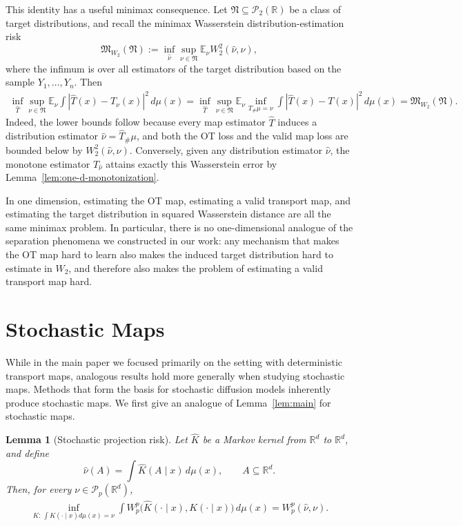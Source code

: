 \documentclass[11pt,twoside]{article}
\newtheorem{lemma}{Lemma}
\newcommand{\targetclass}{\mathfrak{N}}
\newcommand{\wtwominimaxrisk}{\mathfrak M_{W_2}}
\begin{document}
This identity has a useful minimax consequence. Let $\targetclass\subseteq\mathcal{P}_2(\mathbb{R})$ be a class of target distributions, and recall the minimax Wasserstein distribution-estimation risk
\[
\wtwominimaxrisk(\targetclass)
:=
\inf_{\widehat{\nu}}
\sup_{\nu\in\targetclass}
\mathbb{E}_\nu W_2^2(\widehat{\nu},\nu),
\]
where the infimum is over all estimators of the target distribution based on the sample $Y_1,\ldots,Y_n$. Then
\begin{align}
\label{eq:one-d-minimax-equivalence}
\inf_{\widehat{T}}
\sup_{\nu\in\targetclass}
\mathbb{E}_\nu
\int |\widehat{T}(x)-T_\nu(x)|^2\,d\mu(x)
=
\inf_{\widehat{T}}
\sup_{\nu\in\targetclass}
\mathbb{E}_\nu
\inf_{T_{\#}\mu=\nu}
\int |\widehat{T}(x)-T(x)|^2\,d\mu(x)
=
\wtwominimaxrisk(\targetclass).
\end{align}
Indeed, the lower bounds follow because every map estimator $\widehat{T}$ induces a distribution estimator $\widehat{\nu}=\widehat{T}_{\#}\mu$, and both the OT loss and the valid map loss are bounded below by $W_2^2(\widehat{\nu},\nu)$. Conversely, given any distribution estimator $\widehat{\nu}$, the monotone estimator $T_{\widehat{\nu}}$ attains exactly this Wasserstein error by Lemma~\ref{lem:one-d-monotonization}.

In one dimension, estimating the OT map, estimating a valid transport map, and estimating the target distribution in squared Wasserstein distance are all the same minimax problem. In particular, there is no one-dimensional analogue of the separation phenomena we constructed in our work: any mechanism that makes the OT map hard to learn also makes the induced target distribution hard to estimate in $W_2$, and therefore also makes the problem of estimating a valid transport map hard.

\section{Stochastic Maps}
\label{app:stochastic}

While in the main paper we focused primarily on the setting with deterministic transport maps, analogous results hold more generally when studying stochastic maps. Methods that form
the basis for stochastic diffusion models inherently produce stochastic maps. We first give an analogue of Lemma~\ref{lem:main} for stochastic maps.

\begin{lemma}[Stochastic projection risk]
\label{lem:stochastic-main}
Let $\widehat{K}$ be a Markov kernel from $\mathbb{R}^d$ to $\mathbb{R}^d$, and define
\[
\widehat{\nu}(A)
=
\int \widehat{K}(A\mid x)\,d\mu(x),
\qquad A\subseteq \mathbb{R}^d.
\]
Then, for every $\nu\in\mathcal{P}_p(\mathbb{R}^d)$,
\begin{align}
\label{eq:stochastic-projection}
\inf_{K:\,\int K(\cdot\mid x)d\mu(x)=\nu}
\int W_p^p\bigl(\widehat{K}(\cdot\mid x),K(\cdot\mid x)\bigr)\,d\mu(x)
=
W_p^p(\widehat{\nu},\nu).
\end{align}
\end{lemma}
\end{document}
